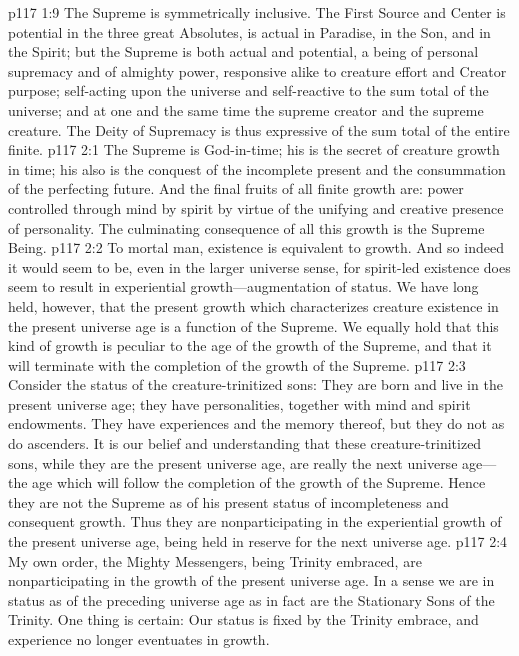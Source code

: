 \vs p117 1:9 The Supreme is symmetrically inclusive. The First Source and Center is potential in the three great Absolutes, is actual in Paradise, in the Son, and in the Spirit; but the Supreme is both actual and potential, a being of personal supremacy and of almighty power, responsive alike to creature effort and Creator purpose; self\hyp{}acting upon the universe and self\hyp{}reactive to the sum total of the universe; and at one and the same time the supreme creator and the supreme creature. The Deity of Supremacy is thus expressive of the sum total of the entire finite.
\vs p117 2:1 The Supreme is God\hyp{}in\hyp{}time; his is the secret of creature growth in time; his also is the conquest of the incomplete present and the consummation of the perfecting future. And the final fruits of all finite growth are: power controlled through mind by spirit by virtue of the unifying and creative presence of personality. The culminating consequence of all this growth is the Supreme Being.
\vs p117 2:2 To mortal man, existence is equivalent to growth. And so indeed it would seem to be, even in the larger universe sense, for spirit\hyp{}led existence does seem to result in experiential growth---augmentation of status. We have long held, however, that the present growth which characterizes creature existence in the present universe age is a function of the Supreme. We equally hold that this kind of growth is peculiar to the age of the growth of the Supreme, and that it will terminate with the completion of the growth of the Supreme.
\pc \vs p117 2:3 Consider the status of the creature\hyp{}trinitized sons: They are born and live in the present universe age; they have personalities, together with mind and spirit endowments. They have experiences and the memory thereof, but they do not  as do ascenders. It is our belief and understanding that these creature\hyp{}trinitized sons, while they are  the present universe age, are really  the next universe age---the age which will follow the completion of the growth of the Supreme. Hence they are not  the Supreme as of his present status of incompleteness and consequent growth. Thus they are nonparticipating in the experiential growth of the present universe age, being held in reserve for the next universe age.
\vs p117 2:4 My own order, the Mighty Messengers, being Trinity embraced, are nonparticipating in the growth of the present universe age. In a sense we are in status as of the preceding universe age as in fact are the Stationary Sons of the Trinity. One thing is certain: Our status is fixed by the Trinity embrace, and experience no longer eventuates in growth.
